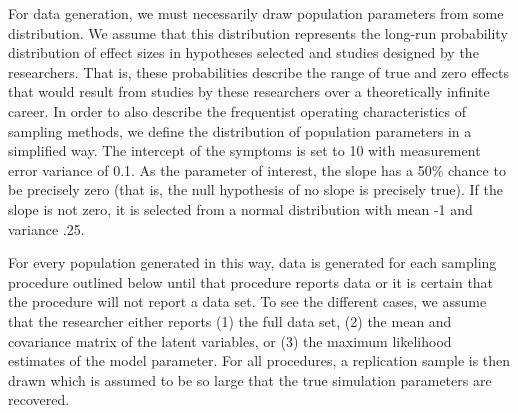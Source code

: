 \documentclass[man]{apa7}\usepackage[]{graphicx}\usepackage[]{xcolor}
\theoremstyle{definition}
\begin{document}
For data generation, we must necessarily draw population parameters from some distribution.  We assume that this distribution represents the long-run probability distribution of effect sizes in hypotheses selected and studies designed by the researchers.  That is, these probabilities describe the range of true and zero effects that would result from studies by these researchers over a theoretically infinite career.  In order to also describe the frequentist operating characteristics of sampling methods, we define the distribution of population parameters in a simplified way. The intercept of the symptoms is set to 10 with measurement error variance of 0.1.  As the parameter of interest, the slope has a 50\% chance to be precisely zero (that is, the null hypothesis of no slope is precisely true).  If the slope is not zero, it is selected from a normal distribution with mean -1 and variance .25.

For every population generated in this way, data is generated for each sampling procedure outlined below until that procedure reports data or it is certain that the procedure will not report a data set. To see the different cases, we assume that the researcher either reports (1) the full data set, (2) the mean and covariance matrix of the latent variables, or (3) the maximum likelihood estimates of the model parameter. For all procedures, a replication sample is then drawn which is assumed to be so large that the true simulation parameters are recovered. 
\end{document}
